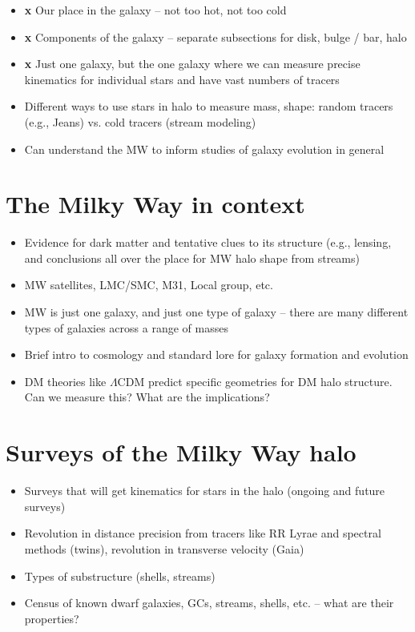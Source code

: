 \begin{itemize}
	\item {\bf x} Our place in the galaxy -- not too hot, not too cold
	\item {\bf x} Components of the galaxy -- separate subsections for disk, bulge / bar, halo
	\item {\bf x} Just one galaxy, but the one galaxy where we can measure precise kinematics for individual stars and have vast numbers of tracers
	\item Different ways to use stars in halo to measure mass, shape: random tracers (e.g., Jeans) vs. cold tracers (stream modeling)
	\item Can understand the MW to inform studies of galaxy evolution in general
\end{itemize}

\section{The Milky Way in context}\label{sec:milkyway-context}

\begin{itemize}
	\item Evidence for dark matter and tentative clues to its structure (e.g., lensing, and conclusions all over the place for MW halo shape from streams)
	\item MW satellites, LMC/SMC, M31, Local group, etc.
	\item MW is just one galaxy, and just one type of galaxy -- there are many different types of galaxies across a range of masses
	\item Brief intro to cosmology and standard lore for galaxy formation and evolution
	\item DM theories like $\Lambda$CDM predict specific geometries for DM halo structure. Can we measure this? What are the implications?
\end{itemize}

\section{Surveys of the Milky Way halo}\label{sec:surveys}

\begin{itemize}
	\item Surveys that will get kinematics for stars in the halo (ongoing and future surveys)
	\item Revolution in distance precision from tracers like RR Lyrae and spectral methods (twins), revolution in transverse velocity (Gaia)
	\item Types of substructure (shells, streams)
	\item Census of known dwarf galaxies, GCs, streams, shells, etc. -- what are their properties?
\end{itemize}

